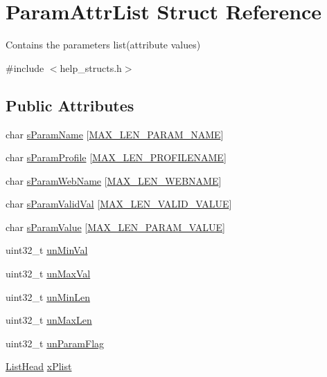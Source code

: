 \hypertarget{structParamAttrList}{\section{Param\-Attr\-List Struct Reference}
\label{structParamAttrList}
}


Contains the parameters list(attribute values)  




{\ttfamily \#include $<$help\-\_\-structs.\-h$>$}

\subsection*{Public Attributes}
\begin{DoxyCompactItemize}
\item 
char \hyperlink{structParamAttrList_a4f361455c9f6518e7571b7dcd37799d1}{s\-Param\-Name} \mbox{[}\hyperlink{group__LIBHELP_gaac5d922b6e3eb48b7ba829979fd73ae2}{M\-A\-X\-\_\-\-L\-E\-N\-\_\-\-P\-A\-R\-A\-M\-\_\-\-N\-A\-M\-E}\mbox{]}
\item 
char \hyperlink{structParamAttrList_a2053def555ac67f0e39742cdd467cec5}{s\-Param\-Profile} \mbox{[}\hyperlink{group__LIBHELP_ga7b87580b87e217a2cc87a362a19c91e5}{M\-A\-X\-\_\-\-L\-E\-N\-\_\-\-P\-R\-O\-F\-I\-L\-E\-N\-A\-M\-E}\mbox{]}
\item 
char \hyperlink{structParamAttrList_a279353c868f69304db1ab9e0620dd08a}{s\-Param\-Web\-Name} \mbox{[}\hyperlink{group__LIBHELP_gad283ffd6255aeb7b05ce1ed512a81102}{M\-A\-X\-\_\-\-L\-E\-N\-\_\-\-W\-E\-B\-N\-A\-M\-E}\mbox{]}
\item 
char \hyperlink{structParamAttrList_a75dc56c3f70323a05748c59882e8203e}{s\-Param\-Valid\-Val} \mbox{[}\hyperlink{group__LIBHELP_ga121f77f1d2f8588180ca5a258fe36765}{M\-A\-X\-\_\-\-L\-E\-N\-\_\-\-V\-A\-L\-I\-D\-\_\-\-V\-A\-L\-U\-E}\mbox{]}
\item 
char \hyperlink{structParamAttrList_a626d8635ccd1c07d4e04a938ad880035}{s\-Param\-Value} \mbox{[}\hyperlink{group__LIBHELP_ga1b79b737d896845c1c07d942ffbfe3fa}{M\-A\-X\-\_\-\-L\-E\-N\-\_\-\-P\-A\-R\-A\-M\-\_\-\-V\-A\-L\-U\-E}\mbox{]}
\item 
uint32\-\_\-t \hyperlink{structParamAttrList_ae51e6c2f62b765283184b01d5cabc4d8}{un\-Min\-Val}
\item 
uint32\-\_\-t \hyperlink{structParamAttrList_a990542ae05c218ca1bcbb2b12bd1880d}{un\-Max\-Val}
\item 
uint32\-\_\-t \hyperlink{structParamAttrList_adb113fb2072819c1cbccf7316f05bc0c}{un\-Min\-Len}
\item 
uint32\-\_\-t \hyperlink{structParamAttrList_a47232c322bb7aa44bc8281de097b0126}{un\-Max\-Len}
\item 
uint32\-\_\-t \hyperlink{structParamAttrList_a8188e3f7aa3c97eda168df546152e0ae}{un\-Param\-Flag}
\item 
\hyperlink{group__LIBHELP_ga73f73d414f252ff46652f16495641187}{List\-Head} \hyperlink{structParamAttrList_a7eece3633e85108272b7629c06100271}{x\-Plist}
\end{DoxyCompactItemize}


